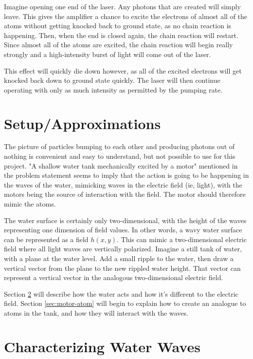 \documentclass[12pt]{article}
\begin{document}
Imagine opening one end of the laser. Any photons that are created will simply leave. This gives the amplifier a chance to excite the electrons of almost all of the atoms without getting knocked back to ground state, as no chain reaction is happening. Then, when the end is closed again, the chain reaction will restart. Since almost all of the atoms are excited, the chain reaction will begin really strongly and a high-intensity burst of light will come out of the laser.

This effect will quickly die down however, as all of the excited electrons will get knocked back down to ground state quickly. The laser will then continue operating with only as much intensity as permitted by the pumping rate.



\section{Setup/Approximations}\label{sec:setup}

The picture of particles bumping to each other and producing photons out of nothing is convenient and easy to understand, but not possible to use for this project. "A shallow water tank mechanically excited by a motor" mentioned in the problem statement seems to imply that the action is going to be happening in the waves of the water, mimicking waves in the electric field (ie, light), with the motors being the source of interaction with the field. The motor should therefore mimic the atoms.

The water surface is certainly only two-dimensional, with the height of the waves representing one dimension of field values. In other words, a wavy water surface can be represented as a field $h(x, y)$. This can mimic a two-dimensional electric field where all light waves are vertically polarized. Imagine a still tank of water, with a plane at the water level. Add a small ripple to the water, then draw a vertical vector from the plane to the new rippled water height. That vector can represent a vertical vector in the analogous two-dimensional electric field.

Section \ref{sec:electric-water} will describe how the water acts and how it's different to the electric field. Section \ref{sec:motor-atom} will begin to explain how to create an analogue to atoms in the tank, and how they will interact with the waves.



\section{Characterizing Water Waves}\label{sec:electric-water}
\end{document}

